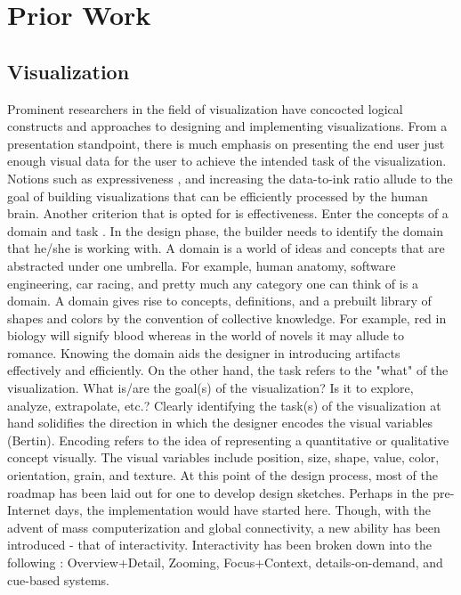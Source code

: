 \documentclass[12pt]{article}
\begin{document}
\section{Prior Work}
\subsection{Visualization}
Prominent researchers in the field of visualization have concocted logical constructs and approaches to designing and implementing visualizations. From a presentation standpoint, there is much emphasis on presenting the end user just enough visual data for the user to achieve the intended task of the visualization. Notions such as expressiveness \cite{schumann}, and increasing the data-to-ink ratio \cite{tufte} allude to the goal of building visualizations that can be efficiently processed by the human brain. Another criterion that is opted for is effectiveness. Enter the concepts of a domain and task \cite{munzner}. In the design phase, the builder needs to identify the domain that he/she is working with. A domain is a world of ideas and concepts that are abstracted under one umbrella. For example, human anatomy, software engineering, car racing, and pretty much any category one can think of is a domain. A domain gives rise to concepts, definitions, and a prebuilt library of shapes and colors by the convention of collective knowledge. For example, red in biology will signify blood whereas in the world of novels it may allude to romance. Knowing the domain aids the designer in introducing artifacts effectively and efficiently. On the other hand, the task refers to the "what" of the visualization. What is/are the goal(s) of the visualization? Is it to explore, analyze, extrapolate, etc.? Clearly identifying the task(s) of the visualization at hand solidifies the direction in which the designer encodes the visual variables (Bertin). Encoding refers to the idea of representing a quantitative or qualitative concept visually. The visual variables include position, size, shape, value, color, orientation, grain, and texture. At this point of the design process, most of the roadmap has been laid out for one to develop design sketches. Perhaps in the pre-Internet days, the implementation would have started here. Though, with the advent of mass computerization and global connectivity, a new ability has been introduced - that of interactivity. Interactivity has been broken down into the following \cite{cockburn}: Overview+Detail, Zooming, Focus+Context, details-on-demand, and cue-based systems.
\end{document}
